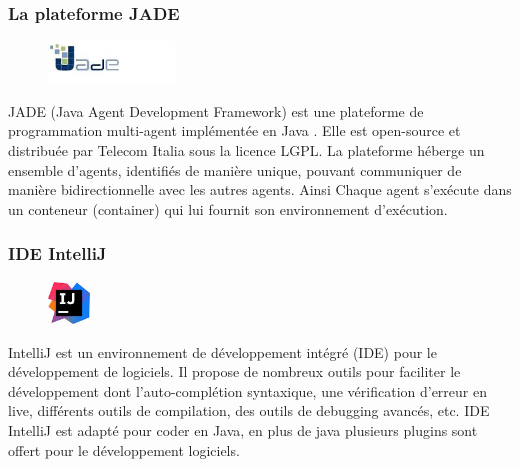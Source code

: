 \subsubsection*{La plateforme JADE}
\begin{figure}
	\vspace{-60pt}
	\begin{center}
		\includegraphics[width=0.3\textwidth]{img/jade}
	\end{center} 
	\vspace{-20pt}
	\vspace{-10pt} 
\end{figure}
JADE (Java Agent Development Framework) est une plateforme de programmation multi-agent implémentée en Java \citep{jade}. Elle est open-source et distribuée par Telecom Italia sous la licence LGPL. La plateforme héberge un ensemble d’agents, identifiés de manière unique, pouvant communiquer de manière bidirectionnelle avec les autres agents. Ainsi Chaque agent s’exécute dans un conteneur (container) qui lui fournit son environnement d’exécution.
\subsubsection*{IDE IntelliJ}
\begin{figure}
	\vspace{-40pt}
	\begin{center}
		\includegraphics[width=0.1\textwidth]{img/ida}
	\end{center} 
	\vspace{-20pt}
	\vspace{-10pt} 
\end{figure}
IntelliJ est un environnement de développement intégré (IDE) pour le développement de logiciels. Il propose de nombreux outils pour faciliter le développement dont  l'auto-complétion syntaxique, une vérification d'erreur en live, différents outils de compilation, des outils de debugging avancés, etc. IDE IntelliJ est adapté pour coder en Java, en plus de java plusieurs plugins sont offert pour le développement logiciels.

